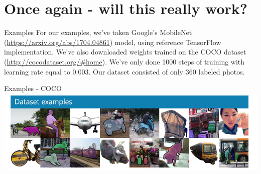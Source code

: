 \documentclass[aspectratio=1610,english]{beamer} %
\begin{document}
 \section{Once again - will this really work?}
  	\begin{frame}{Examples}
		For our examples, we've taken Google's MobileNet (\url{https://arxiv.org/abs/1704.04861}) model, using reference TensorFlow implementation. We've also downloaded weights trained on the COCO dataset (\url{http://cocodataset.org/\#home}).\newline
		We've only done 1000 steps of training with learning rate equal to 0.003.\newline
		Our dataset consisted of only 360 labeled photos.
	\end{frame}
	\begin{frame}{Examples - COCO}
		\includegraphics[scale=0.5]{images/coco-examples}
	\end{frame}
\end{document}
